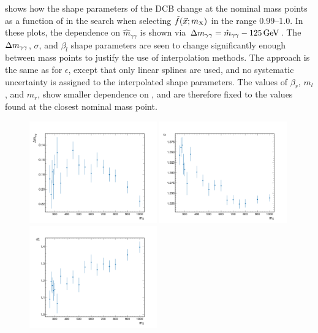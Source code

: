  shows how the shape parameters of the DCB change at the nominal mass points as a function of \mX in the \XTwoHH search when selecting $\tilde{f}(\vec{x};m_{\mathrm{X}})$ in the range 0.99--1.0. In these plots, the dependence on $\hat{m}_{\gamma\gamma}$ is shown via $\Delta m_{\gamma\gamma} = \hat{m}_{\gamma\gamma}-125\,\text{Ge\hspace{-.08em}V}$. The $\Delta m_{\gamma\gamma}$, $\sigma$, and $\beta_l$ shape parameters are seen to change significantly enough between mass points to justify the use of interpolation methods. The approach is the same as for $\epsilon$, except that only linear splines are used, and no systematic uncertainty is assigned to the interpolated shape parameters. The values of $\beta_r$, $m_l$, and $m_r$, show smaller dependence on \mX, and are therefore fixed to the values found at the closest nominal mass point. 

\begin{figure}
  \centering
  \includegraphics[width=0.49\textwidth]{Figures/Dihiggs/signal/shape_change/graviton_dm.pdf}
  \includegraphics[width=0.49\textwidth]{Figures/Dihiggs/signal/shape_change/graviton_sigma.pdf} \\
  \includegraphics[width=0.49\textwidth]{Figures/Dihiggs/signal/shape_change/graviton_bl.pdf}

\end{figure}
